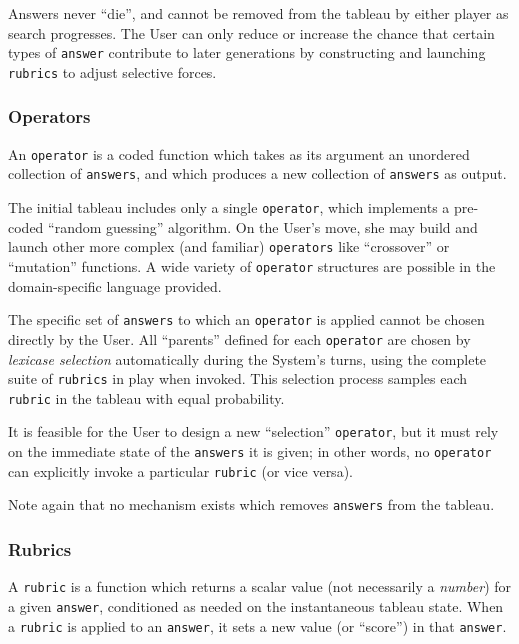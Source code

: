 Answers never ``die'', and cannot be removed from the tableau by either player as search progresses. The User can only reduce or increase the chance that certain types of {\tt answer} contribute to later generations by constructing and launching {\tt rubrics} to adjust selective forces.

\subsubsection{Operators}\hypertarget{operators}{}\label{operators}

An {\tt operator} is a coded function which takes as its argument an unordered  collection of {\tt answers}, and which produces a new collection of {\tt answers} as output.

The initial tableau includes only a single {\tt operator}, which implements a pre-coded ``random guessing'' algorithm. On the User's move, she may build and launch other more complex (and familiar) {\tt operators} like ``crossover'' or ``mutation'' functions. A wide variety of {\tt operator} structures are possible in the domain-specific language provided.

The specific set of {\tt answers} to which an {\tt operator} is applied cannot be chosen directly by the User. All ``parents'' defined for each {\tt operator} are chosen by \emph{lexicase selection} automatically during the System's turns, using the complete suite of {\tt rubrics} in play when invoked. This selection process samples each {\tt rubric} in the tableau with equal probability.

It is feasible for the User to design a new ``selection'' {\tt operator}, but it must rely on the immediate state of the {\tt answers} it is given; in other words, no {\tt operator} can explicitly invoke a particular {\tt rubric} (or vice versa).

Note again that no mechanism exists which removes {\tt answers} from the tableau.

\subsubsection{Rubrics}\hypertarget{rubrics}{}\label{rubrics}

A {\tt rubric} is a function which returns a scalar value (not necessarily a \emph{number}) for a given {\tt answer}, conditioned as needed on the instantaneous tableau state. When a {\tt rubric} is applied to an {\tt answer}, it sets a new value (or ``score'') in that {\tt answer}.

